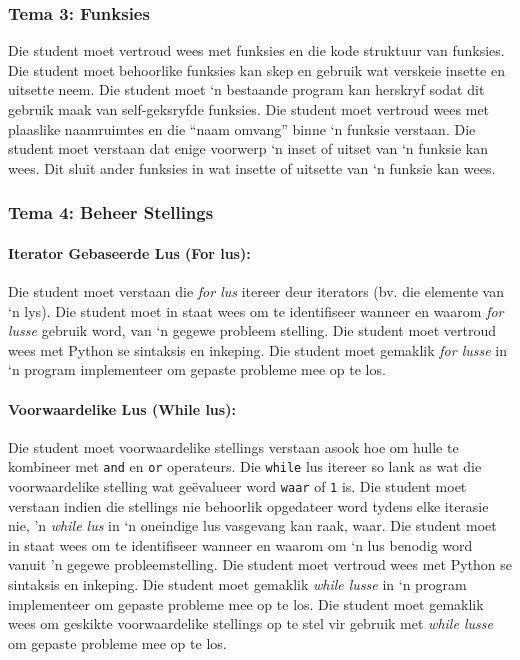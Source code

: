         \subsubsection{Tema 3: Funksies}
            Die student moet vertroud wees met funksies en die kode struktuur
            van funksies.  Die student moet behoorlike funksies kan skep en
            gebruik wat verskeie insette en uitsette neem.  Die student moet `n
            bestaande program kan herskryf sodat dit gebruik maak van
            self-geksryfde funksies.  Die student moet vertroud wees met
            plaaslike naamruimtes en die ``naam omvang'' binne `n funksie
            verstaan.  Die student moet verstaan dat enige voorwerp `n inset of
            uitset van `n funksie kan wees.  Dit sluit ander funksies in wat
            insette of uitsette van `n funksie kan wees.

        \subsubsection{Tema 4: Beheer Stellings}
            \paragraph{Iterator Gebaseerde Lus (For lus):}
                Die student moet verstaan die \textit{for lus} itereer deur
                iterators (bv. die elemente van `n lys). Die student moet in
                staat wees om te identifiseer wanneer en waarom \textit{for
                lusse} gebruik  word, van `n gegewe probleem stelling. Die
                student moet vertroud wees met Python se sintaksis en inkeping.
                Die student moet gemaklik \textit{for lusse} in `n
                program implementeer om gepaste probleme mee op te los.

            \paragraph{Voorwaardelike Lus (While lus):}
                Die student moet voorwaardelike stellings verstaan asook hoe om
                hulle te kombineer met \texttt{and} en \texttt{or} operateurs.
                Die \texttt{while} lus itereer so lank as wat die
                voorwaardelike stelling wat ge\"evalueer word \texttt{waar} of
                \texttt{1} is. Die student moet verstaan indien die stellings
                nie behoorlik opgedateer word tydens elke iterasie nie, 'n
                \textit{while lus} in `n oneindige lus vasgevang kan raak,
                waar. Die student moet in staat wees om te identifiseer wanneer
                en waarom om `n  lus benodig word vanuit 'n
                gegewe probleemstelling. Die student moet vertroud wees met
                Python se sintaksis en inkeping. Die student moet gemaklik
                \textit{while lusse} in `n program implementeer om gepaste
                probleme mee op te los. Die student moet gemaklik wees om
                geskikte voorwaardelike stellings op te stel vir gebruik met
                \textit{while lusse} om gepaste probleme mee op te los.


